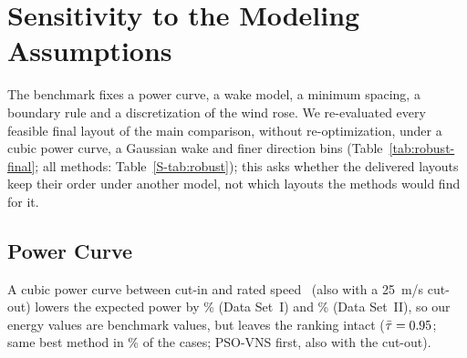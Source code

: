 \section{Sensitivity to the Modeling Assumptions}
\label{sec:robustness}
The benchmark fixes a power curve, a wake model, a minimum spacing, a boundary rule and a discretization of the wind rose. We re-evaluated every feasible final layout of the main comparison, without re-optimization, under a cubic power curve, a Gaussian wake and finer direction bins (Table~\ref{tab:robust-final}; all methods: Table~\ref{S-tab:robust}); this asks whether the delivered layouts keep their order under another model, not which layouts the methods would find for it.


\subsection{Power Curve}
\label{sec:powercurve}
A cubic power curve between cut-in and rated speed~\cite{Carrillo2013} (also with a 25~m/s cut-out) lowers the expected power by \NCubicOverI\% (Data Set~I) and \NCubicOverII\% (Data Set~II), so our energy values are benchmark values, but leaves the ranking intact ($\bar\tau=0.95$; same best method in \NSameCubic\% of the cases; PSO-VNS first, also with the cut-out).

